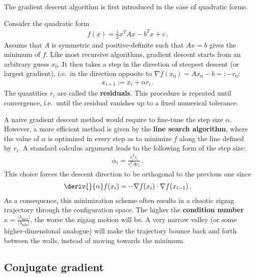     The gradient descent algorithm is first introduced in the case of quadratic forms.
    \begin{method}
        Consider the quadratic form
        \begin{gather}
            f(x) = \frac{1}{2}x^TAx - b^Tx + c\,.
        \end{gather}
        Assume that $A$ is symmetric and positive-definite such that $Ax=b$ gives the minimum of $f$. Like most recursive algorithms, gradient descent starts from an arbitrary guess $x_0$. It then takes a step in the direction of steepest descent (or largest gradient), i.e.~in the direction opposite to $\nabla f(x_0) = Ax_0-b =: -r_0$:
        \begin{gather}
            x_{i+1} := x_i + \alpha r_i\,.
        \end{gather}
        The quantities $r_i$ are called the \textbf{residuals}. This procedure is repeated until convergence, i.e.~until the residual vanishes up to a fixed numerical tolerance.

        A naive gradient descent method would require to fine-tune the step size $\alpha$. However, a more efficient method is given by the \textbf{line search algorithm}, where the value of $\alpha$ is optimized in every step as to minimize $f$ along the line defined by $r_i$. A standard calculus argument leads to the following form of the step size:
        \begin{gather}
            \alpha_i = \frac{r_i^Tr_i}{r_i^TAr_i}\,.
        \end{gather}
        This choice forces the descent direction to be orthogonal to the previous one since
        \begin{gather}
            \deriv{}{\alpha}f(x_i) = -\nabla f(x_i)\cdot\nabla f(x_{i-1})\,.
        \end{gather}
        As a consequence, this minimization scheme often results in a chaotic zigzag trajectory through the configuration space. The higher the \textbf{condition number} $\kappa=\frac{|\lambda_{\max}|}{|\lambda_{\min}|}$, the worse the zigzag motion will be. A very narrow valley (or some higher-dimensional analogue) will make the trajectory bounce back and forth between the walls, instead of moving towards the minimum.
    \end{method}

\subsection{Conjugate gradient}

